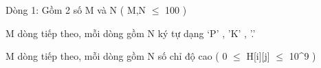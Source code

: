 Dòng 1: Gồm 2 số M và N ( M,N  $\le$  100 )

M dòng tiếp theo, mỗi dòng gồm N ký tự dạng ‘P’ , ’K’ , ’.’

M dòng tiếp theo, mỗi dòng gồm N số chỉ độ cao ( 0  $\le$  H[i][j]  $\le$  10^9 )